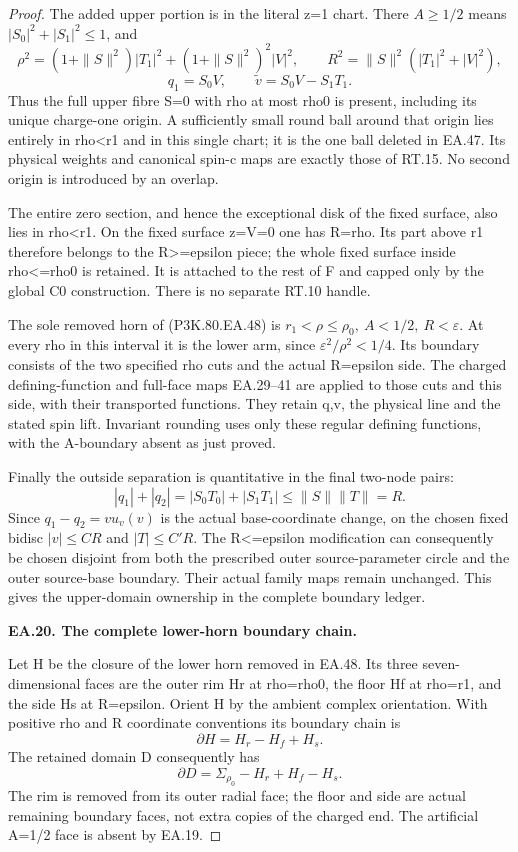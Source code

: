 \begin{proof}
The added upper portion is in the literal z=1 chart. There
\(A\ge1/2\) means \(|S_0|^2+|S_1|^2\le1\), and
\[
 \rho^2=(1+\|S\|^2)|T_1|^2
                 +(1+\|S\|^2)^2|V|^2,
 \qquad R^2=\|S\|^2(|T_1|^2+|V|^2),
\]
\[
             q_1=S_0V,\qquad
             \widetilde v=S_0V-S_1T_1.
 \tag{P3K.80.EA.49}
\]
Thus the full upper fibre S=0 with rho at most rho0 is present,
including its unique charge-one origin. A sufficiently small
round ball around that origin lies entirely in rho<r1 and in
this single chart; it is the one ball deleted in EA.47. Its
physical weights and canonical spin-c maps are exactly those of
RT.15. No second origin is introduced by an overlap.

The entire zero section, and hence the exceptional disk of the
fixed surface, also lies in rho<r1. On the fixed surface z=V=0
one has R=rho. Its part above r1 therefore belongs to the
R>=epsilon piece; the whole fixed surface inside rho<=rho0
is retained. It is attached to the rest of F and capped only by
the global C0 construction. There is no separate RT.10 handle.

The sole removed horn of (P3K.80.EA.48) is
\(r_1<\rho\le\rho_0,\ A<1/2,\ R<\varepsilon\).
At every rho in this interval it is the lower arm, since
\(\varepsilon^2/\rho^2<1/4\). Its boundary consists of the
two specified rho cuts and the actual R=epsilon side. The
charged defining-function and full-face maps EA.29--41 are
applied to those cuts and this side, with their transported
functions. They retain q,v, the physical line and the stated
spin lift. Invariant rounding uses only these regular defining
functions, with the A-boundary absent as just proved.

Finally the outside separation is quantitative in the final
two-node pairs:
\[
 |q_1|+|q_2|=|S_0T_0|+|S_1T_1|
                       \le\|S\|\|T\|=R.
\]
Since \(q_1-q_2=v u_v(v)\) is the actual base-coordinate
change, on the chosen fixed bidisc
\(|v|\le C R\) and \(|T|\le C'R\).
The R<=epsilon modification can consequently be chosen disjoint
from both the prescribed outer source-parameter circle and the
outer source-base boundary. Their actual family maps remain
unchanged. This gives the upper-domain ownership in the complete boundary ledger.

\par\medskip\noindent\textbf{EA.20. The complete lower-horn boundary chain.}\par\nopagebreak[4]

Let H be the closure of the lower horn removed in EA.48. Its
three seven-dimensional faces are the outer rim Hr at rho=rho0,
the floor Hf at rho=r1, and the side Hs at R=epsilon. Orient H
by the ambient complex orientation. With positive rho and R
coordinate conventions its boundary chain is
\[
                       \partial H=H_r-H_f+H_s.
 \tag{P3K.80.EA.50}
\]
The retained domain D consequently has
\[
              \partial D=\Sigma_{\rho_0}-H_r+H_f-H_s.
 \tag{P3K.80.EA.51}
\]
The rim is removed from its outer radial face; the floor and
side are actual remaining boundary faces, not extra copies of
the charged end. The artificial A=1/2 face is absent by EA.19.


\end{proof}
